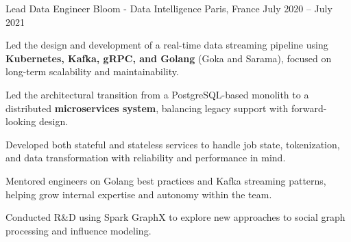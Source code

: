 \begin{cventries}
\cventry
  {Lead Data Engineer} %
  {Bloom - Data Intelligence} %
  {Paris, France} %
  {July 2020 – July 2021} %
  {
    \begin{cvitems} %
      \item {Led the design and development of a real-time data streaming pipeline using \textbf{Kubernetes, Kafka, gRPC, and Golang} (Goka and Sarama), focused on long-term scalability and maintainability.}
      \item {Led the architectural transition from a PostgreSQL-based monolith to a distributed \textbf{microservices system}, balancing legacy support with forward-looking design.}
      \item {Developed both stateful and stateless services to handle job state, tokenization, and data transformation with reliability and performance in mind.}
      \item {Mentored engineers on Golang best practices and Kafka streaming patterns, helping grow internal expertise and autonomy within the team.}
      \item {Conducted R\&D using Spark GraphX to explore new approaches to social graph processing and influence modeling.}
    \end{cvitems}
  }


\end{cventries}
